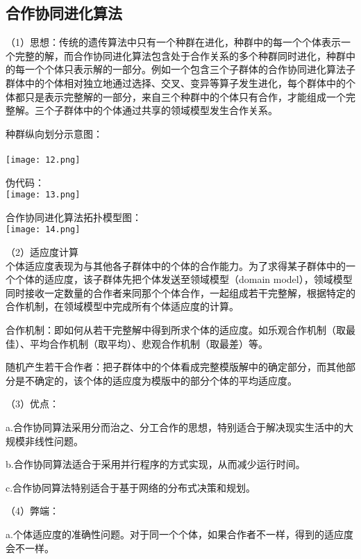 \documentclass[8pt]{article}
\begin{document}
\subsection{合作协同进化算法}
\begin{description}
      \item（1）思想：传统的遗传算法中只有一个种群在进化，种群中的每一个个体表示一个完整的解，而合作协同进化算法包含处于合作关系的多个种群同时进化，种群中的每一个个体只表示解的一部分。例如一个包含三个子群体的合作协同进化算法子群体中的个体相对独立地通过选择、交叉、变异等算子发生进化，每个群体中的个体都只是表示完整解的一部分，来自三个种群中的个体只有合作，才能组成一个完整解。三个子群体中的个体通过共享的领域模型发生合作关系。
      \item 种群纵向划分示意图：\\\\
       \texttt{[image: 12.png]}
      \item 伪代码：\\
      \texttt{[image: 13.png]}
      \item 合作协同进化算法拓扑模型图：\\
      \texttt{[image: 14.png]}
        \item（2）适应度计算\\
        个体适应度表现为与其他各子群体中的个体的合作能力。为了求得某子群体中的一个个体的适应度，该子群体先把个体发送至领域模型（domain model），领域模型同时接收一定数量的合作者来同那个个体合作，一起组成若干完整解，根据特定的合作机制，在领域模型中完成所有个体适应度的计算。
        \item 合作机制：即如何从若干完整解中得到所求个体的适应度。如乐观合作机制（取最佳）、平均合作机制（取平均）、悲观合作机制（取最差）等。
        \item 随机产生若干合作者：把子群体中的个体看成完整模版解中的确定部分，而其他部分是不确定的，该个体的适应度为模版中的部分个体的平均适应度。
      \item（3）优点：
      \item a.合作协同算法采用分而治之、分工合作的思想，特别适合于解决现实生活中的大规模非线性问题。
      \item b.合作协同算法适合于采用并行程序的方式实现，从而减少运行时间。
      \item c.合作协同算法特别适合于基于网络的分布式决策和规划。    
      \item（4）弊端：
      \item a.个体适应度的准确性问题。对于同一个个体，如果合作者不一样，得到的适应度会不一样。

\end{description}
\end{document}
